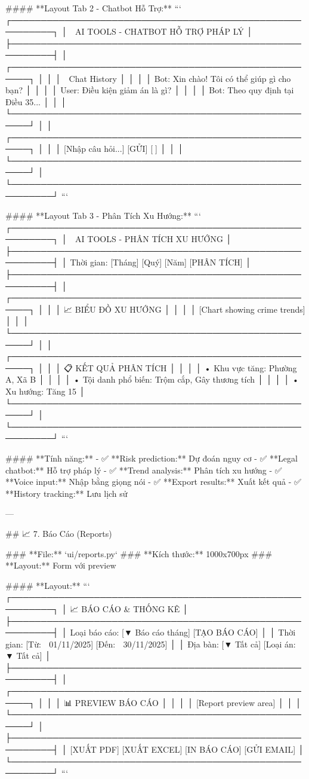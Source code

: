 #### **Layout Tab 2 - Chatbot Hỗ Trợ:**
```
┌─────────────────────────────────────────────────────────┐
│ 🤖 AI TOOLS - CHATBOT HỖ TRỢ PHÁP LÝ                 │
├─────────────────────────────────────────────────────────┤
│ ┌─────────────────────────────────────────────────────┐ │
│ │ 💬 Chat History                                    │ │
│ │ Bot: Xin chào! Tôi có thể giúp gì cho bạn?        │ │
│ │ User: Điều kiện giảm án là gì?                    │ │
│ │ Bot: Theo quy định tại Điều 35...                  │ │
│ └─────────────────────────────────────────────────────┘ │
│ ┌─────────────────────────────────────────────────────┐ │
│ │ [Nhập câu hỏi...] [GỬI] [🎤]                     │ │
│ └─────────────────────────────────────────────────────┘ │
└─────────────────────────────────────────────────────────┘
```

#### **Layout Tab 3 - Phân Tích Xu Hướng:**
```
┌─────────────────────────────────────────────────────────┐
│ 🤖 AI TOOLS - PHÂN TÍCH XU HƯỚNG                     │
├─────────────────────────────────────────────────────────┤
│ Thời gian: [Tháng] [Quý] [Năm] [PHÂN TÍCH]           │
├─────────────────────────────────────────────────────────┤
│ ┌─────────────────────────────────────────────────────┐ │
│ │ 📈 BIỂU ĐỒ XU HƯỚNG                               │ │
│ │ [Chart showing crime trends]                       │ │
│ └─────────────────────────────────────────────────────┘ │
│ ┌─────────────────────────────────────────────────────┐ │
│ │ 📋 KẾT QUẢ PHÂN TÍCH                              │ │
│ │ • Khu vực tăng: Phường A, Xã B                    │ │
│ │ • Tội danh phổ biến: Trộm cắp, Gây thương tích   │ │
│ │ • Xu hướng: Tăng 15%
│ └─────────────────────────────────────────────────────┘ │
└─────────────────────────────────────────────────────────┘
```

#### **Tính năng:**
- ✅ **Risk prediction:** Dự đoán nguy cơ
- ✅ **Legal chatbot:** Hỗ trợ pháp lý
- ✅ **Trend analysis:** Phân tích xu hướng
- ✅ **Voice input:** Nhập bằng giọng nói
- ✅ **Export results:** Xuất kết quả
- ✅ **History tracking:** Lưu lịch sử

---

## 📈 7. Báo Cáo (Reports)

### **File:** `ui/reports.py`
### **Kích thước:** 1000x700px
### **Layout:** Form với preview

#### **Layout:**
```
┌─────────────────────────────────────────────────────────┐
│ 📈 BÁO CÁO & THỐNG KÊ                                 │
├─────────────────────────────────────────────────────────┤
│ Loại báo cáo: [▼ Báo cáo tháng] [TẠO BÁO CÁO]       │
│ Thời gian: [Từ: 📅 01/11/2025] [Đến: 📅 30/11/2025] │
│ Địa bàn: [▼ Tất cả] [Loại án: ▼ Tất cả]             │
├─────────────────────────────────────────────────────────┤
│ ┌─────────────────────────────────────────────────────┐ │
│ │ 📊 PREVIEW BÁO CÁO                                │ │
│ │ [Report preview area]                              │ │
│ └─────────────────────────────────────────────────────┘ │
├─────────────────────────────────────────────────────────┤
│ [XUẤT PDF] [XUẤT EXCEL] [IN BÁO CÁO] [GỬI EMAIL]    │
└─────────────────────────────────────────────────────────┘
```

